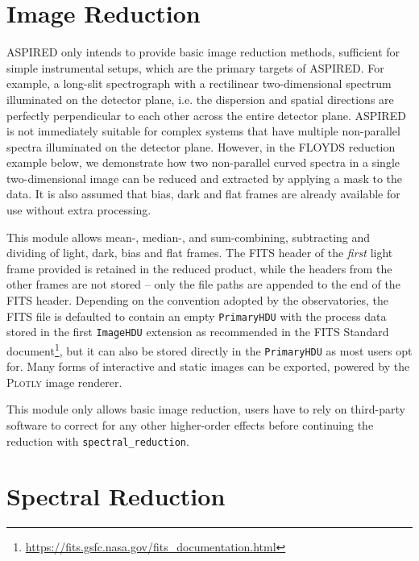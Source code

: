 \documentclass[linenumbers, twocolumn]{aastex631}
\begin{document}
\section{Image Reduction}
\label{sec:image_reduction}

\textsc{ASPIRED} only intends to provide basic image reduction methods,
sufficient for simple instrumental setups, which are the primary targets of
\textsc{ASPIRED}. For example, a long-slit spectrograph with a rectilinear
two-dimensional spectrum illuminated on the detector plane, i.e. the dispersion
and spatial directions are perfectly perpendicular to each other across the
entire detector plane. \textsc{ASPIRED} is not immediately suitable for
complex systems that have multiple non-parallel spectra illuminated on the
detector plane. However, in the FLOYDS reduction example below, we
demonstrate how two non-parallel curved spectra in a single two-dimensional
image can be reduced and extracted by applying a mask to the data. It is also
assumed that bias, dark and flat frames are already available for use without
extra processing.

This module allows mean-, median-, and sum-combining, subtracting and dividing
of light, dark, bias and flat frames. The FITS header of the \textit{first}
light frame provided is retained in the reduced product, while the headers
from the other frames
are not stored -- only the file paths are appended to the end of the FITS header. Depending on
the convention adopted by the observatories, the FITS file is defaulted to
contain an empty \texttt{PrimaryHDU} with the process data stored in the
first \texttt{ImageHDU} extension as recommended in the FITS Standard 
document\footnote{\url{https://fits.gsfc.nasa.gov/fits_documentation.html}},
but it can also be stored directly in the \texttt{PrimaryHDU} as most users
opt for. Many forms of interactive and static images can be exported,
powered by the \textsc{Plotly} image renderer.

This module only allows basic image reduction, users have to rely on third-party
software to correct for any other higher-order effects before continuing the
reduction with \texttt{spectral\_reduction}.

\section{Spectral Reduction}
\label{sec:spectral_reduction}
\end{document}
